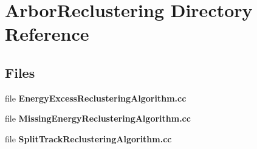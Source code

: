 \section{Arbor\+Reclustering Directory Reference}
\label{dir_15166a2ad4c1d519d95f017634c8f4c0}
\subsection*{Files}
\begin{DoxyCompactItemize}
\item 
file {\bf Energy\+Excess\+Reclustering\+Algorithm.\+cc}
\item 
file {\bf Missing\+Energy\+Reclustering\+Algorithm.\+cc}
\item 
file {\bf Split\+Track\+Reclustering\+Algorithm.\+cc}
\end{DoxyCompactItemize}
